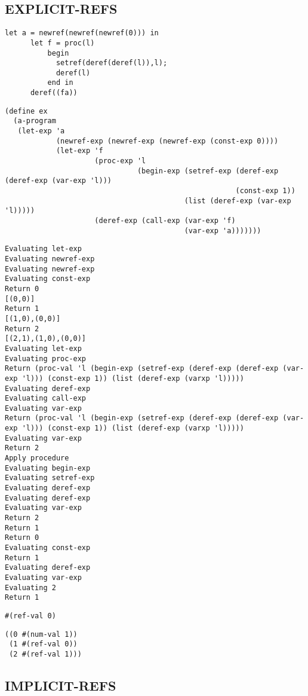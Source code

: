 \documentclass[../main.tex]{subfiles}
\begin{document}
\subsection{EXPLICIT-REFS}

\begin{lstlisting}
let a = newref(newref(newref(0))) in
      let f = proc(l)
          begin
            setref(deref(deref(l)),l);
            deref(l)
          end in
      deref((fa))
\end{lstlisting}

\begin{lstlisting}
(define ex
  (a-program
   (let-exp 'a
            (newref-exp (newref-exp (newref-exp (const-exp 0))))
            (let-exp 'f
                     (proc-exp 'l
                               (begin-exp (setref-exp (deref-exp (deref-exp (var-exp 'l)))
                                                      (const-exp 1))
                                          (list (deref-exp (var-exp 'l)))))
                     (deref-exp (call-exp (var-exp 'f)
                                          (var-exp 'a)))))))
\end{lstlisting}

\begin{lstlisting}
Evaluating let-exp
Evaluating newref-exp
Evaluating newref-exp
Evaluating const-exp
Return 0
[(0,0)]
Return 1
[(1,0),(0,0)]
Return 2
[(2,1),(1,0),(0,0)]
Evaluating let-exp
Evaluating proc-exp
Return (proc-val 'l (begin-exp (setref-exp (deref-exp (deref-exp (var-exp 'l))) (const-exp 1)) (list (deref-exp (varxp 'l)))))
Evaluating deref-exp
Evaluating call-exp
Evaluating var-exp
Return (proc-val 'l (begin-exp (setref-exp (deref-exp (deref-exp (var-exp 'l))) (const-exp 1)) (list (deref-exp (varxp 'l)))))
Evaluating var-exp
Return 2
Apply procedure
Evaluating begin-exp
Evaluating setref-exp
Evaluating deref-exp
Evaluating deref-exp
Evaluating var-exp
Return 2
Return 1
Return 0
Evaluating const-exp
Return 1
Evaluating deref-exp
Evaluating var-exp
Evaluating 2
Return 1
\end{lstlisting}

\begin{lstlisting}
#(ref-val 0)
\end{lstlisting}



\begin{lstlisting}
((0 #(num-val 1))
 (1 #(ref-val 0))
 (2 #(ref-val 1)))
\end{lstlisting}

\subsection{IMPLICIT-REFS}
\end{document}
